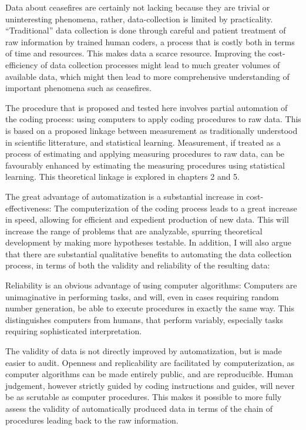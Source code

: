 \documentclass[12pt,twoside]{reedthesis}
\begin{document}
Data about ceasefires are certainly not lacking because they are trivial
or uninteresting phenomena, rather, data-collection is limited by
practicality. ``Traditional'' data collection is done through careful
and patient treatment of raw information by trained human coders, a
process that is costly both in terms of time and resources. This makes
data a scarce resource. Improving the cost-efficiency of data collection
processes might lead to much greater volumes of available data, which
might then lead to more comprehensive understanding of important
phenomena such as ceasefires.

The procedure that is proposed and tested here involves partial
automation of the coding process: using computers to apply coding
procedures to raw data. This is based on a proposed linkage between
measurement as traditionally understood in scientific litterature, and
statistical learning. Measurement, if treated as a process of estimating
and applying measuring procedures to raw data, can be favourably
enhanced by estimating the measuring procedures using statistical
learning. This theoretical linkage is explored in chapters 2 and 5.

The great advantage of automatization is a substantial increase in
cost-effectiveness: The computerization of the coding process leads to a
great increase in speed, allowing for efficient and expedient production
of new data. This will increase the range of problems that are
analyzable, spurring theoretical development by making more hypotheses
testable. In addition, I will also argue that there are substantial
qualitative benefits to automating the data collection process, in terms
of both the validity and reliability of the resulting data:

Reliability is an obvious advantage of using computer algorithms:
Computers are unimaginative in performing tasks, and will, even in cases
requiring random number generation, be able to execute procedures in
exactly the same way. This distinguishes computers from humans, that
perform variably, especially tasks requiring sophisticated
interpretation.

The validity of data is not directly improved by automatization, but is
made easier to audit. Openness and replicability are facilitated by
computerization, as computer algorithms can be made entirely public, and
are reproducible. Human judgement, however strictly guided by coding
instructions and guides, will never be as scrutable as computer
procedures. This makes it possible to more fully assess the validity of
automatically produced data in terms of the chain of procedures leading
back to the raw information.
\end{document}
